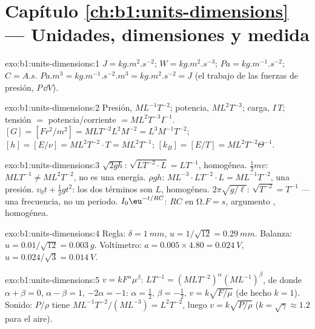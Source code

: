 \section*{Capítulo \ref{ch:b1:units-dimensions} --- Unidades, dimensiones y medida}

\begin{solution}{exo:b1:units-dimensions:1}
$\unit{J} = \unit{kg.m^2.s^{-2}}$; $\unit{W} = \unit{kg.m^2.s^{-3}}$;
$\unit{Pa} = \unit{kg.m^{-1}.s^{-2}}$; $\unit{C} = \unit{A.s}$.
$\unit{Pa.m^3} = \unit{kg.m^{-1}.s^{-2}.m^3} = \unit{kg.m^2.s^{-2}} = \unit{J}$
(el trabajo de las fuerzas de presión, $P\,\dd V$).
\end{solution}

\begin{solution}{exo:b1:units-dimensions:2}
Presión, $M L^{-1} T^{-2}$; potencia, $M L^2 T^{-3}$; carga, $I\,T$;
tensión $= $ potencia/corriente $= M L^2 T^{-3} I^{-1}$.
$[G] = [F r^2/m^2] = M L T^{-2} L^2 M^{-2} = L^3 M^{-1} T^{-2}$;
$[h] = [E/\nu] = M L^2 T^{-2} \cdot T = M L^2 T^{-1}$;
$[k_B] = [E/T] = M L^2 T^{-2} \Theta^{-1}$.
\end{solution}

\begin{solution}{exo:b1:units-dimensions:3}
$\sqrt{2gh}$: $\sqrt{L T^{-2} \cdot L} = L T^{-1}$, homogénea.
$\tfrac12 mv$: $M L T^{-1} \neq M L^2 T^{-2}$, no es una energía.
$\rho g h$: $M L^{-3} \cdot L T^{-2} \cdot L = M L^{-1} T^{-2}$, una presión.
$v_0 t + \tfrac12 g t^2$: los dos términos son $L$, homogénea.
$2\pi\sqrt{g/\ell}$: $\sqrt{T^{-2}} = T^{-1}$ --- una frecuencia, no un periodo.
$I_0\eu^{-t/RC}$: $RC$ en $\unit{\ohm.F} = \unit{s}$, argumento , homogénea.
\end{solution}

\begin{solution}{exo:b1:units-dimensions:4}
Regla: $\delta = \qty{1}{mm}$, $u = 1/\sqrt{12} = \qty{0.29}{mm}$.
Balanza: $u = 0.01/\sqrt{12} = \qty{0.003}{g}$.
Voltímetro: $a = 0.005 \times 4.80 = \qty{0.024}{V}$,
$u = 0.024/\sqrt3 = \qty{0.014}{V}$.
\end{solution}

\begin{solution}{exo:b1:units-dimensions:5}
$v = k F^\alpha \mu^\beta$: $L T^{-1} = (M L T^{-2})^\alpha (M L^{-1})^\beta$,
de donde $\alpha + \beta = 0$, $\alpha - \beta = 1$, $-2\alpha = -1$:
$\alpha = \tfrac12$, $\beta = -\tfrac12$, $v = k\sqrt{F/\mu}$ (de hecho $k = 1$).
Sonido: $P/\rho$ tiene  $M L^{-1} T^{-2} / (M L^{-3}) = L^2 T^{-2}$,
luego $v = k\sqrt{P/\rho}$ ($k = \sqrt\gamma \approx 1.2$ para el aire).
\end{solution}

